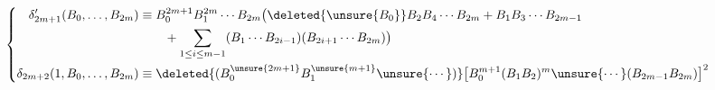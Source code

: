 \[
\left\{\begin{aligned}
\delta'_{2m+1}(B_0,\ldots,B_{2m})&\equiv B_0^{2m+1}B_1^{2m}\cdots B_{2m}\bigl(\deleted{\unsure{B_0}}B_2 B_4\cdots B_{2m}+ B_1B_3\cdots B_{2m-1}\\
&\qquad+\sum_{1\le i\le m-1}(B_1\cdots B_{2i-1})(B_{2i+1}\cdots B_{2m})\bigr)\\
\delta_{2m+2}(1,B_0,\ldots,B_{2m})&\equiv\deleted{(B_0^{\unsure{2m+1}}B_1^{\unsure{m+1}}\unsure{\cdots})}
\bigl[B_0^{m+1}(B_1 B_2)^m\unsure{\cdots}(B_{2m-1}B_{2m})\bigr]^2
\end{aligned}\right.
\]



